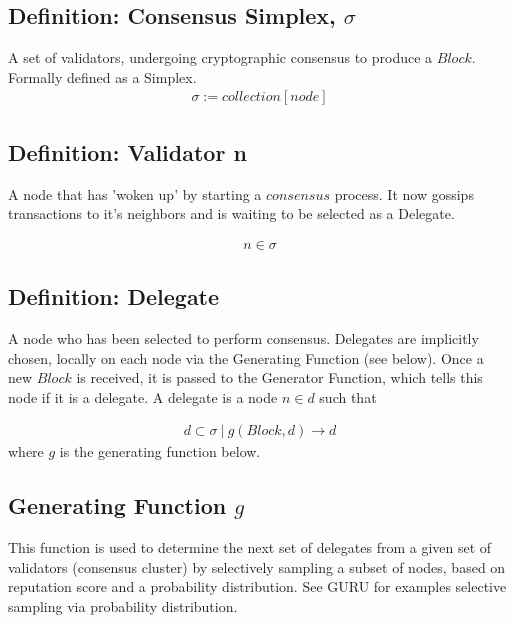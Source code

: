 \documentclass{article}
\begin{document}
\subsection{Definition: Consensus Simplex, $\sigma$}
A set of validators, undergoing cryptographic consensus to produce a $Block$. Formally defined as a Simplex.
\begin{equation} \label{eq1}
\begin{split}
\sigma := collection[node]
\end{split}
\end{equation}

\subsection{Definition: Validator n}
A node that has 'woken up' by starting a $consensus$ process. It now gossips transactions to it's neighbors and is waiting to be selected as a Delegate.

\begin{equation} \label{eq1}
\begin{split}
n \in \sigma
\end{split}
\end{equation}

\subsection{Definition: Delegate}
A node who has been selected to perform consensus. Delegates are implicitly chosen, locally on each node via the Generating Function (see below). Once a new $Block$ is received, it is passed to the Generator Function, which tells this node if it is a delegate. A delegate is a node $n \in d$ such that

\begin{equation} \label{eq1}
\begin{split}
d \subset \sigma \ | \ g(Block, d) \rightarrow d
\end{split}
\end{equation}
where $g$ is the generating function below.

\subsection{Generating Function $g$}
This function is used to determine the next set of delegates from a given set of validators (consensus cluster) by selectively sampling a subset of nodes, based on reputation score and a probability distribution. See GURU for examples selective sampling via probability distribution.
\end{document}
